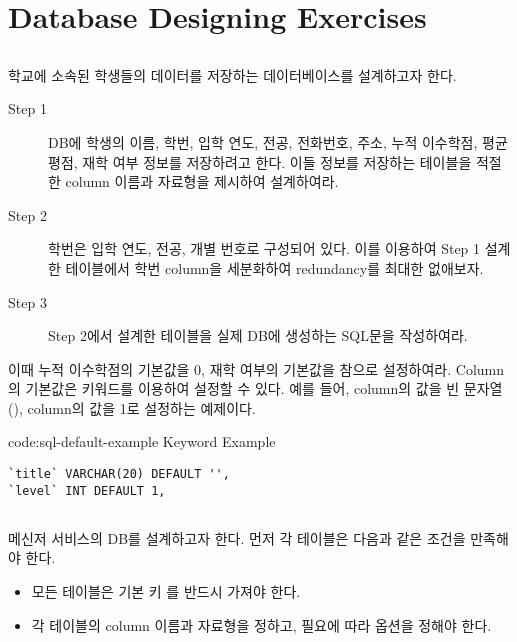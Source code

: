 \section{Database Designing Exercises}\label{sect:database-designing-exercises}

\subsection*{}

학교에 소속된 학생들의 데이터를 저장하는 데이터베이스를 설계하고자 한다.

\begin{description}
    \item[Step 1] DB에 학생의 이름, 학번, 입학 연도, 전공, 전화번호, 주소, 누적 이수학점, 평균 평점, 재학 여부 정보를 저장하려고 한다. 이들 정보를 저장하는 테이블을 적절한 column 이름과 자료형을 제시하여 설계하여라.
    \item[Step 2] 학번은 입학 연도, 전공, 개별 번호로 구성되어 있다. 이를 이용하여 Step 1 설계한 테이블에서 학번 column을 세분화하여 redundancy를 최대한 없애보자.
    \item[Step 3] Step 2에서 설계한 테이블을 실제 DB에 생성하는 SQL문을 작성하여라.
\end{description}

이때 누적 이수학점의 기본값을 0, 재학 여부의 기본값을 참으로 설정하여라. Column의 기본값은  키워드를 이용하여 설정할 수 있다. 예를 들어, \은  column의 값을 빈 문자열(),  column의 값을 1로 설정하는 예제이다.

\begin{codeenv}{code:sql-default-example}{ Keyword Example}\begin{verbatim}
`title` VARCHAR(20) DEFAULT '',
`level` INT DEFAULT 1,
\end{verbatim}
\end{codeenv}

\subsection*{}

메신저 서비스의 DB를 설계하고자 한다. 먼저 각 테이블은 다음과 같은 조건을 만족해야 한다.

\begin{itemize}
    \item 모든 테이블은 기본 키 를 반드시 가져야 한다.
    \item 각 테이블의 column 이름과 자료형을 정하고, 필요에 따라 옵션을 정해야 한다.
\end{itemize}

